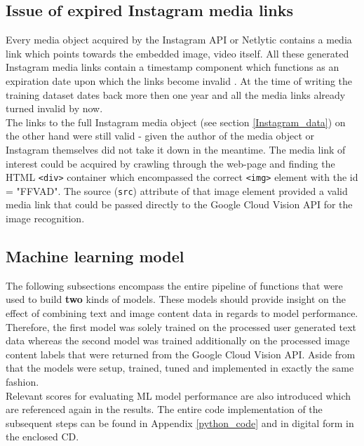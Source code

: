 \subsection{Issue of expired Instagram media links} \label{expired_media_links}
Every media object acquired by the Instagram API or Netlytic contains a media link which points towards the embedded image, video itself. All these generated Instagram media links contain a timestamp component which functions as an expiration date upon which the links become invalid \parencite{Wayne2018}. At the time of writing the training dataset dates back more then one year and all the media links already turned invalid by now. \\ %
The links to the full Instagram media object (see section \ref{Instagram_data}) on the other hand were still valid - given the author of the media object or Instagram themselves did not take it down in the meantime. The media link of interest could be acquired by crawling through the web-page and finding the HTML \texttt{<div>} container which encompassed the correct \texttt{<img>} element with the id = "FFVAD". The source (\texttt{src}) attribute of that image element provided a valid media link that could be passed directly to the Google Cloud Vision API for the image recognition.

\subsection{Machine learning model} \label{ml_model}
The following subsections encompass the entire pipeline of functions that were used to build \textbf{two} kinds of models. These models should provide insight on the effect of combining text and image content data in regards to model performance. Therefore, the first model was solely trained on the processed user generated text data whereas the second model was trained additionally on the processed image content labels that were returned from the Google Cloud Vision API. Aside from that the models were setup, trained, tuned and implemented in exactly the same fashion.\\
Relevant scores for evaluating ML model performance are also introduced which are referenced again in the results. The entire code implementation of the subsequent steps can be found in Appendix \ref{python_code} and in digital form in the enclosed CD.

\clearpage

